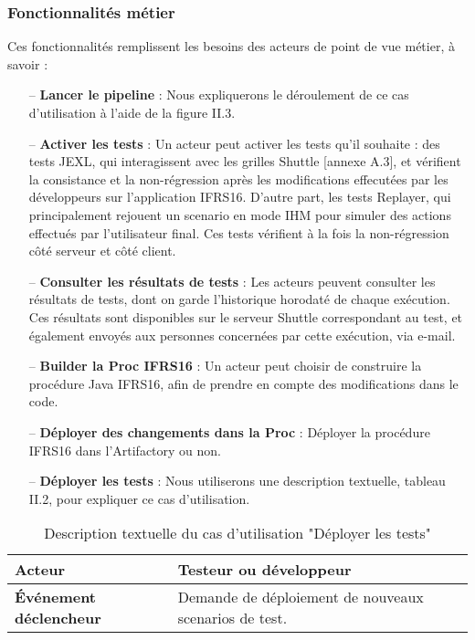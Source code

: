 \begin{spacing}{1.2}
\subsubsection{Fonctionnalités métier}
Ces fonctionnalités remplissent les besoins des acteurs de point de vue métier, à savoir :
\begin{itemize}
    \setlength\itemsep{0em}
    \item[--] \textbf{Lancer le pipeline} : Nous expliquerons le déroulement de ce cas d'utilisation à l'aide de la figure II.3.
    \item[--] \textbf{Activer les tests} : Un acteur peut activer les tests qu'il souhaite : des tests JEXL, qui interagissent avec les grilles Shuttle [annexe A.3], et vérifient la consistance et la non-régression après les modifications effecutées par les développeurs sur l'application IFRS16. D'autre part, les tests Replayer, qui principalement rejouent un scenario en mode IHM pour simuler des actions effectués par l'utilisateur final. Ces tests vérifient à la fois la non-régression côté serveur et côté client. 
    \item[--] \textbf{Consulter les résultats de tests} :
    Les acteurs peuvent consulter les résultats de tests, dont on garde l'historique horodaté de chaque exécution. Ces résultats sont disponibles sur le serveur Shuttle correspondant au test, et également envoyés aux personnes concernées par cette exécution, via e-mail.
    \item[--] \textbf{Builder la Proc IFRS16} : Un acteur peut choisir de construire la procédure Java IFRS16, afin de prendre en compte des modifications dans le code.
    \item[--] \textbf{Déployer des changements dans la Proc} : Déployer la procédure IFRS16 dans l'Artifactory ou non.
    \item[--] \textbf{Déployer les tests} :
    Nous utiliserons une description textuelle, tableau II.2, pour expliquer ce cas d'utilisation.
\end{itemize}
\begin{table}[ht]
	\centering
	\caption{Description textuelle du cas d’utilisation "Déployer les tests"}
	\footnotesize
	\begin{tabularx}{\textwidth}{|p{3.3cm}|X|}
          \hline
          {\textbf{Acteur}}
          & 
          Testeur ou développeur
          \\
          \hline
          {\textbf{Événement déclencheur}}
          & 
         Demande de déploiement de nouveaux scenarios de test.

\end{tabularx}
\end{table}
\end{spacing}
